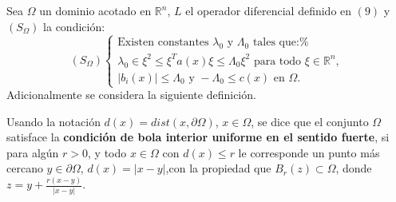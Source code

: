 
Sea $\Omega $ un dominio acotado en $\mathbb{R}^{n}$, $L$ el operador
diferencial definido en $\left( 9\right) $ y $\left( S_{\Omega }\right) $ la
condici\'{o}n:
\begin{equation*}
\left( S_{\Omega }\right) \left\{
\begin{array}{c}
\text{Existen constantes }\lambda _{0}\text{ y }\Lambda _{0}\text{ tales que:%
} \\
\lambda _{0}\in \xi ^{2}\leq \xi ^{T}a\left( x\right) \xi \leq \Lambda
_{0}\xi ^{2}\text{ para todo }\xi \in \mathbb{R}^{n}, \\
\left| b_{i}\left( x\right) \right| \leq \Lambda _{0}\text{ y }-\Lambda
_{0}\leq c\left( x\right) \text{ en }\Omega \text{.}
\end{array}
\right.
\end{equation*}
Adicionalmente se considera la siguiente definici\'{o}n.

\begin{definition}
Usando la notaci\'{o}n $d\left( x\right) =dist\left( x,\partial \Omega
\right) $, $x\in \Omega $, se dice que el conjunto $\Omega $ satisface la
\textbf{condici\'{o}n de bola interior uniforme en el sentido fuerte}, si
para alg\'{u}n $r>0$, y todo $x\in \Omega $ con $d\left( x\right) \leq r$ le
corresponde un punto m\'{a}s cercano $y\in \partial \Omega $, $d\left(
x\right) =\left| x-y\right| $,con la propiedad que $B_{r}\left( z\right)
\subset \Omega $, donde $z=y+\frac{r\left( x-y\right) }{\left| x-y\right| }$.
\end{definition}
